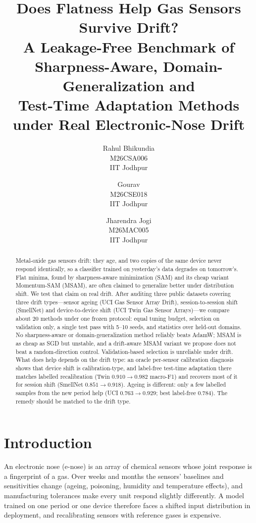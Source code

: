 \documentclass[10pt,twocolumn,letterpaper]{article}
\title{Does Flatness Help Gas Sensors Survive Drift?\\
{\large A Leakage-Free Benchmark of Sharpness-Aware, Domain-Generalization and\\Test-Time Adaptation Methods under Real Electronic-Nose Drift}}
\author{Rahul Bhikundia\\
{M26CSA006}\\
IIT Jodhpur
\and
Gourav\\
{M26CSE018}\\
IIT Jodhpur
\and
Jharendra Jogi\\
{M26MAC005}\\
IIT Jodhpur
}
\begin{document}
\maketitle

\begin{abstract}
Metal-oxide gas sensors drift: they age, and two copies of the same device never respond identically, so a
classifier trained on yesterday's data degrades on tomorrow's. Flat minima, found by sharpness-aware minimization
(SAM) and its cheap variant Momentum-SAM (MSAM), are often claimed to generalize better under distribution shift. We
test that claim on real drift. After auditing three public datasets covering three drift types---sensor ageing (UCI
Gas Sensor Array Drift), session-to-session shift (SmellNet) and device-to-device shift (UCI Twin Gas Sensor
Arrays)---we compare about 20 methods under one frozen protocol: equal tuning budget, selection on validation only,
a single test pass with 5--10 seeds, and statistics over held-out domains. No sharpness-aware or
domain-generalization method reliably beats AdamW; MSAM is as cheap as SGD but unstable, and a drift-aware MSAM
variant we propose does not beat a random-direction control. Validation-based selection is unreliable under drift.
What does help depends on the drift type: an oracle per-sensor calibration diagnosis shows that device shift is
calibration-type, and label-free test-time adaptation there matches labelled recalibration (Twin
$0.910\!\rightarrow\!0.982$ macro-F1) and recovers most of it for session shift (SmellNet
$0.851\!\rightarrow\!0.918$). Ageing is different: only a few labelled samples from the new period help (UCI
$0.763\!\rightarrow\!0.929$; best label-free $0.784$). The remedy should be matched to the drift type.
\end{abstract}

\section{Introduction}
\label{sec:intro}
An electronic nose (e-nose) is an array of chemical sensors whose joint response is a fingerprint of a gas. Over
weeks and months the sensors' baselines and sensitivities change (ageing, poisoning, humidity and temperature
effects), and manufacturing tolerances make every unit respond slightly differently. A model trained on one period
or one device therefore faces a shifted input distribution in deployment, and recalibrating sensors with reference
gases is expensive.
\end{document}
